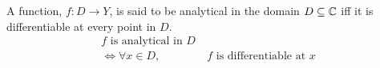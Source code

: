 \begin{definition}
    A function, $f:D\rightarrow Y$, is said to be analytical in the domain $D\subseteq\mathbb{C}$ iff it is differentiable at every point in $D$.
    \begin{align}
        \text{$f$ is analytical in $D$}&\\
            \iff\forall x\in D,&\ \text{$f$ is differentiable at $x$}
    \end{align}
\end{definition}

